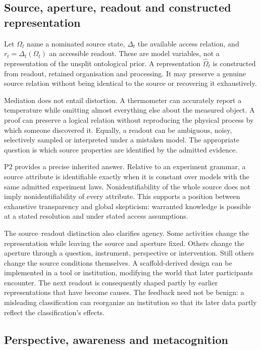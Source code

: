 \documentclass[
  11pt,
  a4paper,
]{article}
\begin{document}
\subsection{Source, aperture, readout and constructed
representation}\label{source-aperture-readout-and-constructed-representation}

Let \(\Omega_t\) name a nominated source state, \(\Delta_t\) the
available access relation, and \(r_t=\Delta_t(\Omega_t)\) an accessible
readout. These are model variables, not a representation of the unsplit
ontological prior. A representation \(\widehat\Omega_t\) is constructed
from readout, retained organisation and processing. It may preserve a
genuine source relation without being identical to the source or
recovering it exhaustively.

Mediation does not entail distortion. A thermometer can accurately
report a temperature while omitting almost everything else about the
measured object. A proof can preserve a logical relation without
reproducing the physical process by which someone discovered it.
Equally, a readout can be ambiguous, noisy, selectively sampled or
interpreted under a mistaken model. The appropriate question is which
source properties are identified by the admitted evidence.

P2 provides a precise inherited answer. Relative to an experiment
grammar, a source attribute is identifiable exactly when it is constant
over models with the same admitted experiment laws. Nonidentifiability
of the whole source does not imply nonidentifiability of every
attribute. This supports a position between exhaustive transparency and
global skepticism: warranted knowledge is possible at a stated
resolution and under stated access assumptions.

The source--readout distinction also clarifies agency. Some activities
change the representation while leaving the source and aperture fixed.
Others change the aperture through a question, instrument, perspective
or intervention. Still others change the source conditions themselves. A
scaffold-derived design can be implemented in a tool or institution,
modifying the world that later participants encounter. The next readout
is consequently shaped partly by earlier representations that have
become causes. The feedback need not be benign: a misleading
classification can reorganize an institution so that its later data
partly reflect the classification's effects.

\subsection{Perspective, awareness and
metacognition}\label{perspective-awareness-and-metacognition}
\end{document}
